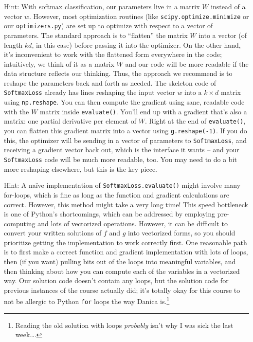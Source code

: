 \documentclass{article}
\begin{document}
Hint: With softmax classification, our parameters live in a matrix $W$ instead of a vector $w$. However, most optimization routines (like \verb|scipy.optimize.minimize| or our \verb|optimizers.py|) are set up to optimize with respect to a vector of parameters. The standard approach is to ``flatten'' the matrix $W$ into a vector (of length $kd$, in this case) before passing it into the optimizer. On the other hand, it's inconvenient to work with the flattened form everywhere in the code; intuitively, we think of it as a matrix $W$ and our code will be more readable if the data structure reflects our thinking. Thus, the approach we recommend is to reshape the parameters back and forth as needed. The skeleton code of \verb|SoftmaxLoss| already has lines reshaping the input vector $w$ into a $k \times d$ matrix using \verb|np.reshape|. You can then compute the gradient using sane, readable code with the $W$ matrix inside \verb|evaluate()|. You'll end up with a gradient that's also a matrix: one partial derivative per element of $W$. Right at the end of \verb|evaluate()|, you can flatten this gradient matrix into a vector using \verb|g.reshape(-1)|. If you do this, the optimizer will be sending in a vector of parameters to \verb|SoftmaxLoss|, and receiving a gradient vector back out, which is the interface it wants -- and your \verb|SoftmaxLoss| code will be much more readable, too. You may need to do a bit more reshaping elsewhere, but this is the key piece.

Hint: A na\"ive implementation of \verb|SoftmaxLoss.evaluate()| might involve many for-loops, which is fine as long as the function and gradient calculations are correct. However, this method might take a very long time! This speed bottleneck is one of Python's shortcomings, which can be addressed by employing pre-computing and lots of vectorized operations. However, it can be difficult to convert your written solutions of $f$ and $g$ into vectorized forms, so you should prioritize getting the implementation to work correctly first. One reasonable path is to first make a correct function and gradient implementation with lots of loops, then (if you want) pulling bits out of the loops into meaningful variables, and then thinking about how you can compute each of the variables in a vectorized way. Our solution code doesn't contain any loops, but the solution code for previous instances of the course actually did; it's totally okay for this course to not be allergic to Python \verb|for| loops the way Danica is.\footnote{Reading the old solution with loops \emph{probably} isn't why I was sick the last week\dots.}
\end{document}
